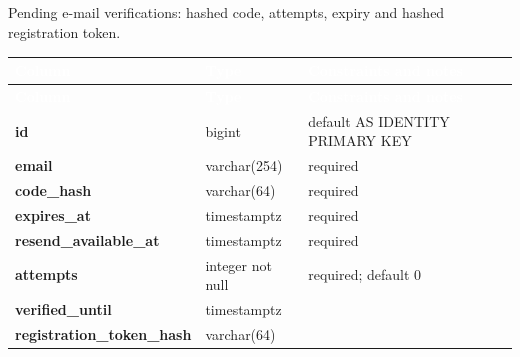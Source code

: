 \subsection*{}
Pending e-mail verifications: hashed code, attempts, expiry and hashed registration token.\par\vspace{2pt}
{\tabfont\rowband
\begin{longtable}{@{}>{\raggedright\arraybackslash}p{}>{\raggedright\arraybackslash}p{}>{\raggedright\arraybackslash}p{}@{}}
\rowcolor{najdanavy}\textcolor{white}{\sffamily\bfseries\small Column} & \textcolor{white}{\sffamily\bfseries\small Type} & \textcolor{white}{\sffamily\bfseries\small Constraints and notes}\\
\endfirsthead
\rowcolor{najdanavy}\textcolor{white}{\sffamily\bfseries\small Column} & \textcolor{white}{\sffamily\bfseries\small Type} & \textcolor{white}{\sffamily\bfseries\small Constraints and notes}\\
\endhead
\bottomrule\endlastfoot
\textbf{id} & bigint & default AS IDENTITY PRIMARY KEY\\
\textbf{email} & varchar(254) & required\\
\textbf{code\_\allowbreak{}hash} & varchar(64) & required\\
\textbf{expires\_\allowbreak{}at} & timestamptz & required\\
\textbf{resend\_\allowbreak{}available\_\allowbreak{}at} & timestamptz & required\\
\textbf{attempts} & integer not null & required; default 0\\
\textbf{verified\_\allowbreak{}until} & timestamptz & \\
\textbf{registration\_\allowbreak{}token\_\allowbreak{}hash} & varchar(64) & \\
\end{longtable}}

